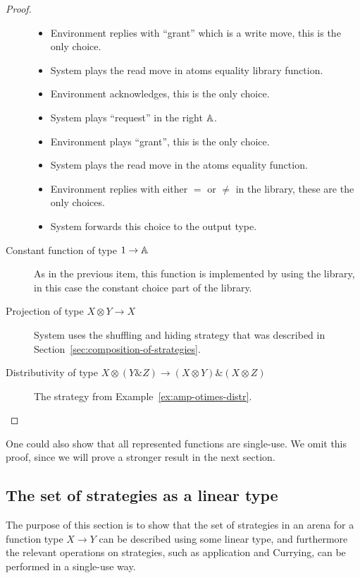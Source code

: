 \begin{proof}
\begin{description}
\begin{itemize}
    \item Environment replies with ``grant'' which is a write move, this is the only choice.
    \item System plays the read move in atoms equality library function.
    \item Environment acknowledges, this is the only choice.
    \item System plays  ``request'' in the right $\mathbb A$.
    \item Environment plays ``grant'', this is the only choice.
    \item System plays the read move in the atoms equality function.
    \item Environment replies with either $=$ or $\neq$ in the library, these are the only choices.
    \item System forwards this choice to the output type.
\end{itemize}
        

        \item[Constant function of type $1 \to \mathbb A$] As in the previous item, this function is implemented by using the library, in this case the constant choice part of the library. 

        \item[Projection of type $ X \otimes Y \to X$] System uses the  shuffling and hiding strategy that was described in Section~\ref{sec:composition-of-strategies}. 

        \item[Distributivity  of type $X \otimes (Y \& Z) \to (X \otimes Y) \& (X \otimes Z)$] The  strategy from Example~\ref{ex:amp-otimes-distr}.  
    \end{description}
\end{proof}
One could also show that all represented functions are single-use. We omit this proof, since we will prove a stronger result in the next section. 

\subsection{The set of strategies as a linear type}
The purpose of this section is to show that the set of strategies in an arena for a function type $X \to Y$ can be described using some linear type, and furthermore the relevant operations on strategies, such as application and Currying, can be performed in a single-use way.

